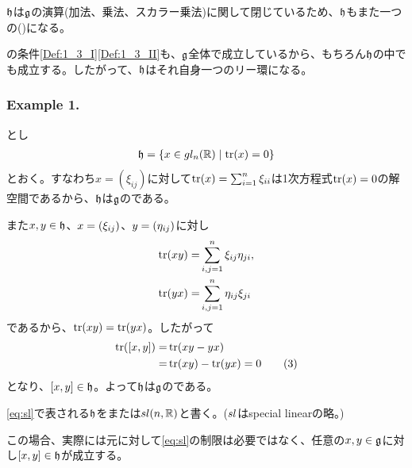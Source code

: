 \documentclass[fleqn,twocolumn,titlepage,dvipdfmx]{jsarticle}
\begin{document}
\begin{remark}
  $\h$は$\g$の演算(加法、乗法、スカラー乗法)に関して閉じているため、$\h$もまた一つの{\環}({})になる。
\end{remark}
\begin{remark}
  {}の条件\ref{Def:1_3_I}\ref{Def:1_3_II}も、$\g$全体で成立しているから、もちろん$\h$の中でも成立する。したがって、$\h$はそれ自身一つのリー環になる。
\end{remark}

\subsubsection*{Example 1.}
\begin{remark}
  とし
  \begin{align}
    \h=\qty{x\in\gl_n(\R) \mid \tr(x)=0} \label{eq:sl}
  \end{align}
  とおく。すなわち$x=(\xi_{ij})$に対して$\tr(x)=\sum_{i=1}^{n}\xi_{ii}$は1次方程式$\tr(x)=0$の解空間であるから、$\h$は$\g$の{}である。

  また$x,y\in\h$、$x=\qty(\xi_{ij})$、$y=\qty(\eta_{ij})$に対し
  \begin{align*}
    \tr(xy) =& \sum_{i,j=1}^{n}\xi_{ij}\eta_{ji},\\
    \tr(yx) =& \sum_{i,j=1}^{n}\eta_{ij}\xi_{ji}
  \end{align*}
  であるから、$\tr(xy)=\tr(yx)$。したがって
  \begin{align*}
    \tr(\comm{x}{y})=&\tr(xy-yx)\\
    =&\tr(xy)-\tr(yx)=0 \tag{3}\label{eq:2_(3)}
  \end{align*}
  となり、$\comm{x}{y}\in\h$。よって$\h$は$\g$の{}である。
\end{remark}

\begin{named}
  \eqref{eq:sl}で表される$\h$をまたは$\sl(n,\R)$と書く。($\sl$はspecial linearの略。)
\end{named}

\begin{remark}
  この場合、実際には元に対して\eqref{eq:sl}の制限は必要ではなく、任意の$x,y\in\g$に対し$\comm{x}{y}\in\h$が成立する。
\end{remark}
\end{document}
